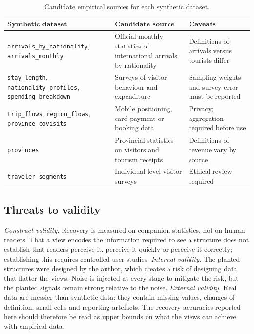 \documentclass[11pt,a4paper]{article}
\begin{document}
\begin{table}[!htbp]
\centering
\caption{Candidate empirical sources for each synthetic dataset.}
\label{tab:realdata}
\small
\begin{tabularx}{\linewidth}{@{}>{\raggedright\arraybackslash}p{4.5cm}>{\raggedright\arraybackslash}X>{\raggedright\arraybackslash}p{4.4cm}@{}}
\toprule
Synthetic dataset & Candidate source & Caveats \\
\midrule
\texttt{arrivals\_by\_nationality}, \texttt{arrivals\_monthly} & Official monthly statistics of international
arrivals by nationality & Definitions of arrivals versus tourists differ \\
\texttt{stay\_length}, \texttt{nationality\_profiles}, \texttt{spending\_breakdown} & Surveys of visitor behaviour
and expenditure & Sampling weights and survey error must be reported \\
\texttt{trip\_flows}, \texttt{region\_flows}, \texttt{province\_covisits} & Mobile positioning, card-payment or
booking data & Privacy; aggregation required before use \\
\texttt{provinces} & Provincial statistics on visitors and tourism receipts & Definitions of revenue vary by
source \\
\texttt{traveler\_segments} & Individual-level visitor surveys & Ethical review required \\
\bottomrule
\end{tabularx}
\end{table}

\subsection{Threats to validity}\label{sec:validity}
\emph{Construct validity.} Recovery is measured on companion statistics, not on human readers. That a view
encodes the information required to see a structure does not establish that readers perceive it, perceive it
quickly or perceive it correctly; establishing this requires controlled user studies.
\emph{Internal validity.} The planted structures were designed by the author, which creates a risk of
designing data that flatter the views. Noise is injected at every stage to mitigate the risk, but the planted
signals remain strong relative to the noise.
\emph{External validity.} Real data are messier than synthetic data: they contain missing values, changes of
definition, small cells and reporting artefacts. The recovery accuracies reported here should therefore be
read as upper bounds on what the views can achieve with empirical data.
\end{document}
